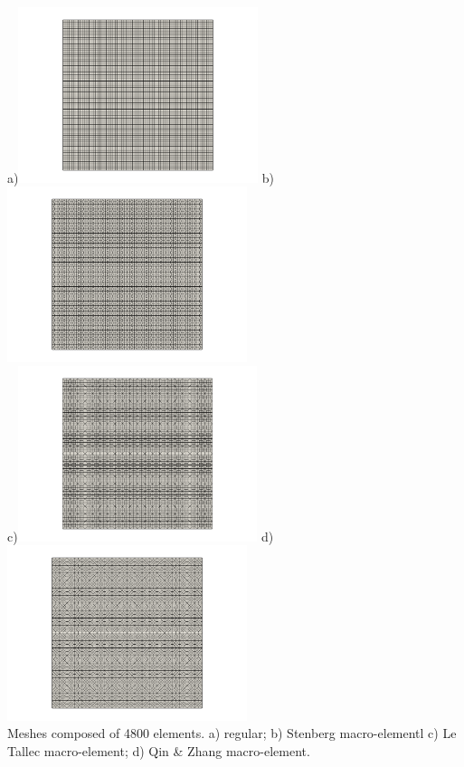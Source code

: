 \begin{center}
a)\includegraphics[width=7cm]{python_codes/fieldstone_78/results/mms/grid0}
b)\includegraphics[width=7cm]{python_codes/fieldstone_78/results/mms/grid1}\\
c)\includegraphics[width=7cm]{python_codes/fieldstone_78/results/mms/grid2}
d)\includegraphics[width=7cm]{python_codes/fieldstone_78/results/mms/grid3}\\
{\captionfont Meshes composed of 4800 elements. a) regular; b) Stenberg macro-elementl 
c) Le Tallec macro-element; d) Qin \& Zhang macro-element.}
\end{center}

